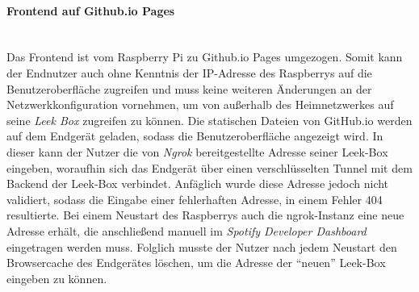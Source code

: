 \documentclass[10pt, a4paper]{article}
\begin{document}
\begin{onehalfspace}
\paragraph*{Frontend auf Github.io Pages} $~$ \\
\label{FrontendAufGithubIOPages}
Das Frontend ist vom Raspberry Pi zu Github.io Pages umgezogen.
Somit kann der Endnutzer auch ohne Kenntnis der IP-Adresse des Raspberrys auf die Benutzeroberfläche zugreifen
und muss keine weiteren Änderungen an der Netzwerkkonfiguration vornehmen, um von außerhalb des Heimnetzwerkes auf seine \textit{Leek Box} zugreifen zu können.
Die statischen Dateien von GitHub.io werden auf dem Endgerät geladen, sodass die Benutzeroberfläche angezeigt wird.
In dieser kann der Nutzer die von \textit{Ngrok} bereitgestellte Adresse seiner Leek-Box eingeben, woraufhin sich das Endgerät über einen verschlüsselten Tunnel mit dem Backend der Leek-Box verbindet.
Anfäglich wurde diese Adresse jedoch nicht validiert, sodass die Eingabe einer fehlerhaften Adresse, in einem Fehler 404 resultierte.
Bei einem Neustart des Raspberrys auch die ngrok-Instanz eine neue Adresse erhält, die anschließend manuell im \textit{Spotify Developer Dashboard} eingetragen werden muss.
Folglich musste der Nutzer nach jedem Neustart den Browsercache des Endgerätes löschen, um die Adresse der \enquote{neuen} Leek-Box eingeben zu können.
\\~\\


\end{onehalfspace}
\end{document}
